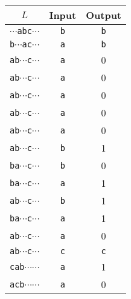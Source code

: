 \begin{tabular}{ccc}
          $L$ & Input & Output \\
\hline
{\tt $\cdots$abc$\cdots$} & {\tt b} &  {\tt b}\\
{\tt b$\cdots$ac$\cdots$} & {\tt a} &  {\tt b}\\
{\tt ab$\cdots$c$\cdots$} & {\tt a} &     0\\
{\tt ab$\cdots$c$\cdots$} & {\tt a} &     0\\
{\tt ab$\cdots$c$\cdots$} & {\tt a} &     0\\
{\tt ab$\cdots$c$\cdots$} & {\tt a} &     0\\
{\tt ab$\cdots$c$\cdots$} & {\tt a} &     0\\
{\tt ab$\cdots$c$\cdots$} & {\tt b} &     1\\
{\tt ba$\cdots$c$\cdots$} & {\tt b} &     0\\
{\tt ba$\cdots$c$\cdots$} & {\tt a} &     1\\
{\tt ab$\cdots$c$\cdots$} & {\tt b} &     1\\
{\tt ba$\cdots$c$\cdots$} & {\tt a} &     1\\
{\tt ab$\cdots$c$\cdots$} & {\tt a} &     0\\
{\tt ab$\cdots$c$\cdots$} & {\tt c} &   {\tt c}\\
{\tt cab$\cdots$$\cdots$} & {\tt a} &     1\\    
{\tt acb$\cdots$$\cdots$} & {\tt a} &     0\\
\end{tabular}
